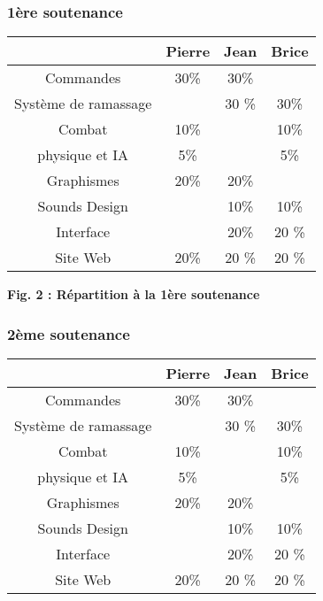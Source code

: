 \documentclass{article}
\begin{document}
\subsubsection{1ère soutenance}

\begin{center}
\begin{tabular}{|c|c|c|c|}
\hline
 & Pierre & Jean & Brice \\
\hline
Commandes & 30\% &30\%  & \\
\hline
Système de ramassage &  & 30 \% & 30\% \\
\hline
Combat & 10\% & & 10\% \\
\hline
 physique et IA & 5\% & & 5\%  \\
\hline
Graphismes & 20\% & 20\% & \\
\hline
Sounds Design&  & 10\% & 10\% \\
\hline
Interface & & 20\% & 20 \% \\
\hline
Site Web & 20\%& 20 \%&20 \% \\ 
\hline
\end{tabular}
\end{center}

\begin{center}
\bf{Fig. 2 : Répartition à la 1ère soutenance}
\end{center}

\subsubsection{2ème soutenance}

\begin{center}
\begin{tabular}{|c|c|c|c|}
\hline
 & Pierre & Jean & Brice \\
\hline
Commandes & 30\% &30\%  & \\
\hline
Système de ramassage &  & 30 \% & 30\% \\
\hline
Combat & 10\% & & 10\% \\
\hline
 physique et IA & 5\% & & 5\%  \\
\hline
Graphismes & 20\% & 20\% & \\
\hline
Sounds Design&  & 10\% & 10\% \\
\hline
Interface & & 20\% & 20 \% \\
\hline
Site Web & 20\%& 20 \%&20 \% \\ 
\hline
\end{tabular}
\end{center}
\end{document}
